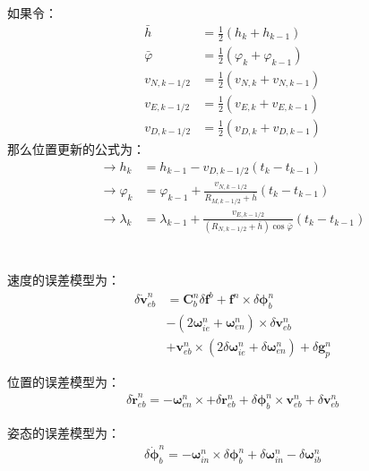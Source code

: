 \documentclass[12pt, twocolumn]{article}
\newcommand{\normf}{\kaishu}
\begin{document}
	\section{\normf{位置更新}}
	如果令：
	\begin{equation*}
		\begin{aligned}
			\bar{h}&=\frac{1}{2}(h_k+h_{k-1})\\
			\bar{\varphi}&=\frac{1}{2}(\varphi_k+\varphi_{k-1})\\
			v_{N,k-1/2}&=\frac{1}{2}(v_{N,k}+v_{N,k-1})\\
			v_{E,k-1/2}&=\frac{1}{2}(v_{E,k}+v_{E,k-1})\\
			v_{D,k-1/2}&=\frac{1}{2}(v_{D,k}+v_{D,k-1})
		\end{aligned}
	\end{equation*}
	那么位置更新的公式为：
	\begin{equation*}
		\begin{aligned}
			\to h_k&=h_{k-1}-v_{D,k-1/2}(t_k-t_{k-1})\\
			\to \varphi_k&=\varphi_{k-1}+\frac{v_{N,k-1/2}}{R_{M,k-1/2}+\bar{h}}(t_k-t_{k-1})\\
			\to \lambda_k&=\lambda_{k-1}+\frac{v_{E,k-1/2}}{(R_{N,k-1/2}+\bar{h})\cos\bar{\varphi}}(t_k-t_{k-1})
		\end{aligned}
	\end{equation*}

	\section{\normf{误差模型}}
	速度的误差模型为：
	\begin{equation*}
		\begin{aligned}
					\delta \boldsymbol{\dot{v}}^n_{eb}&=\boldsymbol{C}_b^n\delta\boldsymbol{f}^b+\boldsymbol{f}^n\times\delta\boldsymbol{\phi}_{b}^n\\
					&-(2\boldsymbol{\omega}_{ie}^n+\boldsymbol{\omega}_{en}^n)\times\delta\boldsymbol{v}^n_{eb}\\
					&+\boldsymbol{v}^n_{eb}\times(2\delta\boldsymbol{\omega}_{ie}^n+\delta\boldsymbol{\omega}_{en}^n)+\delta\boldsymbol{g}_p^n
		\end{aligned}
	\end{equation*}
	
	位置的误差模型为：
	\begin{equation*}
		\begin{aligned}
			\delta\boldsymbol{\dot{r}}^n_{eb}=-\boldsymbol{\omega}^n_{en}\times+\delta\boldsymbol{r}^n_{eb}+\delta\boldsymbol{\phi}^n_b\times\boldsymbol{v}^n_{eb}+\delta\boldsymbol{v}^n_{eb}
		\end{aligned}
	\end{equation*}
	
	姿态的误差模型为：
	\begin{equation*}
		\begin{aligned}
			\delta\boldsymbol{\dot{\phi}}_b^n=-\boldsymbol{\omega}_{in}^n\times\delta\boldsymbol{\phi}_b^n+\delta\boldsymbol{\omega}_{in}^n-\delta\boldsymbol{\omega}_{ib}^n
		\end{aligned}
	\end{equation*}
\end{document}
